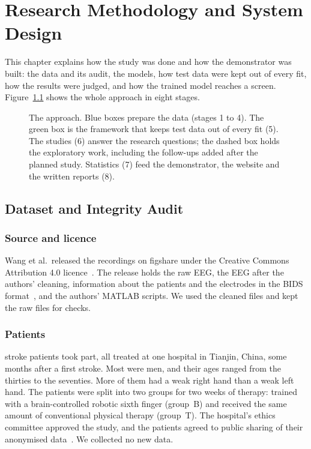 \chapter{Research Methodology and System Design}\label{ch:method}

This chapter explains how the study was done and how the demonstrator was built:
the data and its audit, the models, how test data were kept out of every fit, how the
results were judged, and how the trained model reaches a screen. Figure~\ref{fig:approach} shows the whole approach in eight stages.

\begin{figure}[tbp]
  \centering
  
  \caption[The approach]{The approach. Blue boxes prepare the data (stages 1 to 4). The green box is the
  framework that keeps test data out of every fit (5). The studies (6) answer the research
  questions; the dashed box holds the exploratory work, including the follow-ups added
  after the planned study. Statistics (7) feed the demonstrator, the website and the
  written reports (8).}
  \label{fig:approach}
\end{figure}


\section{Dataset and Integrity Audit}\label{sec:data}

\subsection{Source and licence}
Wang et al.\ released the recordings on figshare under the Creative Commons Attribution
4.0 licence~\cite{wang2026dataset,wang2026figshare}. The release holds the raw EEG, the
EEG after the authors' cleaning, information about the patients and the electrodes in
the BIDS format~\cite{pernet2019}, and the authors' MATLAB scripts. We used the cleaned
files and kept the raw files for checks.

\subsection{Patients}
\nSubjects{} stroke patients took part, all treated at one hospital in Tianjin, China,
some months after a first stroke. Most were men, and their ages ranged from the thirties
to the seventies. More of them had a weak right hand than a weak left hand. The patients
were split into two groups for two weeks of therapy: \nPostGroupB{} trained with a
brain-controlled robotic sixth finger (group~B) and \nPostGroupT{} received the same
amount of conventional physical therapy (group~T). The hospital's ethics committee
approved the study, and the patients agreed to public sharing of their anonymised
data~\cite{wang2026dataset}. We collected no new data.

